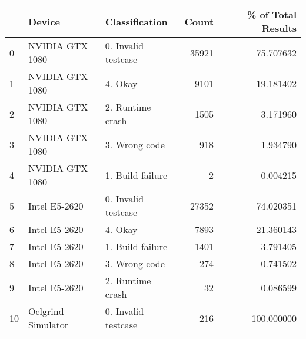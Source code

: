 \begin{tabular}{lllrr}
\toprule
{} &              Device &       Classification &  Count &  \% of Total Results \\
\midrule
0  &     NVIDIA GTX 1080 &  0. Invalid testcase &  35921 &           75.707632 \\
1  &     NVIDIA GTX 1080 &              4. Okay &   9101 &           19.181402 \\
2  &     NVIDIA GTX 1080 &     2. Runtime crash &   1505 &            3.171960 \\
3  &     NVIDIA GTX 1080 &        3. Wrong code &    918 &            1.934790 \\
4  &     NVIDIA GTX 1080 &     1. Build failure &      2 &            0.004215 \\
5  &       Intel E5-2620 &  0. Invalid testcase &  27352 &           74.020351 \\
6  &       Intel E5-2620 &              4. Okay &   7893 &           21.360143 \\
7  &       Intel E5-2620 &     1. Build failure &   1401 &            3.791405 \\
8  &       Intel E5-2620 &        3. Wrong code &    274 &            0.741502 \\
9  &       Intel E5-2620 &     2. Runtime crash &     32 &            0.086599 \\
10 &  Oclgrind Simulator &  0. Invalid testcase &    216 &          100.000000 \\
\bottomrule
\end{tabular}

